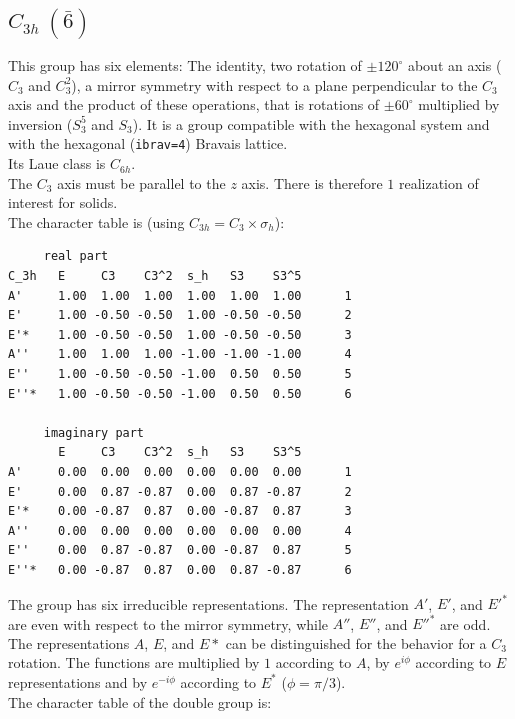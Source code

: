 \documentclass[12pt,a4paper]{article}
\begin{document}
\subsection{\color{web-blue}$C_{3h}\ (\bar 6)$}  
This group has six elements: The identity, two rotation of $\pm120^\circ$ 
about an axis ($C_3$ and $C_3^2$), a mirror symmetry with respect to a 
plane perpendicular to the $C_3$ axis and the product of these operations, 
that is rotations of $\pm60^\circ$ multiplied by inversion ($S_3^5$ and $S_3$).
It is a group compatible with the hexagonal system and with the  
hexagonal (\texttt{ibrav=4}) Bravais lattice. \\ 
Its Laue class is $C_{6h}$. \\
The $C_3$ axis must be parallel to the $z$ axis. There is therefore
$1$ realization of interest for solids. \\
The character table is (using $C_{3h}=C_3 \times \sigma_h$):
\begin{verbatim}
     real part
C_3h   E     C3    C3^2  s_h   S3    S3^5 
A'     1.00  1.00  1.00  1.00  1.00  1.00      1
E'     1.00 -0.50 -0.50  1.00 -0.50 -0.50      2
E'*    1.00 -0.50 -0.50  1.00 -0.50 -0.50      3
A''    1.00  1.00  1.00 -1.00 -1.00 -1.00      4
E''    1.00 -0.50 -0.50 -1.00  0.50  0.50      5
E''*   1.00 -0.50 -0.50 -1.00  0.50  0.50      6

     imaginary part
       E     C3    C3^2  s_h   S3    S3^5 
A'     0.00  0.00  0.00  0.00  0.00  0.00      1
E'     0.00  0.87 -0.87  0.00  0.87 -0.87      2
E'*    0.00 -0.87  0.87  0.00 -0.87  0.87      3
A''    0.00  0.00  0.00  0.00  0.00  0.00      4
E''    0.00  0.87 -0.87  0.00 -0.87  0.87      5
E''*   0.00 -0.87  0.87  0.00  0.87 -0.87      6
\end{verbatim}
The group has six irreducible representations. The representation 
$A'$, $E'$, and $E'^*$ are even with respect to the mirror symmetry, while
$A''$, $E''$, and $E''^*$ are odd. The representations $A$, $E$, and $E*$
can be distinguished for the behavior for a $C_3$ rotation. 
The functions are multiplied by $1$ according to $A$, by $e^{i\phi}$ according to 
$E$ representations and by $e^{-i\phi}$ according to $E^*$ ($\phi=\pi /3$). \\
The character table of the double group is:
\end{document}
